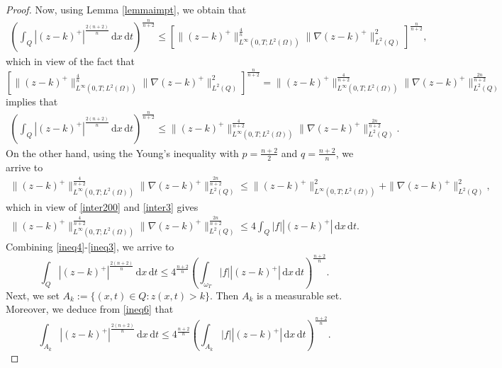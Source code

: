 \documentclass[reqno,twoside]{amsart}
\numberwithin{equation}{section}
\theoremstyle{definition}
\numberwithin{equation}{section}
\def \dis {\displaystyle}
\def \dq {\mathrm{d}x \, \mathrm{d}t}
\begin{document}
\begin{proof}
	Now, using Lemma \ref{lemmaimpt}, we obtain that
	$$
	\begin{array}{lll}
		\dis\left(\int_{Q} |(z-k)^+|^{\frac{2(n+2)}{n}}\,\dq\right)^{\frac{n}{n+2}}
		\leq \left[ \|(z-k)^+\|^{\frac{4}{n}}_{L^\infty(0,T;L^2(\Omega))}\|\nabla(z-k)^+\|^{2}_{L^2(Q)}\right]^{\frac{n}{n+2}},
	\end{array}
	$$
	which in view of the fact that
	$$\dis\left[ \|(z-k)^+\|^{\frac{4}{n}}_{L^\infty(0,T;L^2(\Omega))}\|\nabla(z-k)^+\|^{2}_{L^2(Q)}\right]^{\frac{n}{n+2}}=
	\|(z-k)^+\|^{\frac{4}{n+2}}_{L^\infty(0,T;L^2(\Omega))}\|\nabla(z-k)^+\|^{\frac{2n}{n+2}}_{L^2(Q)}
	$$
	implies that
	\begin{equation}\label{ineq4}
		\begin{array}{lll}
			\dis\left(\int_{Q} |(z-k)^+|^{\frac{2(n+2)}{n}}\,\dq\right)^{\frac{n}{n+2}}
			\leq \|(z-k)^+\|^{\frac{4}{n+2}}_{L^\infty(0,T;L^2(\Omega))}\|\nabla(z-k)^+\|^{\frac{2n}{n+2}}_{L^2(Q)}.
		\end{array}
	\end{equation}
	On the other hand, using the Young's inequality with $p=\frac{n+2}{2}$ and $q=\frac{n+2}{n}$, we arrive to
	$$
	\begin{array}{lll}
		\dis \|(z-k)^+\|^{\frac{4}{n+2}}_{L^\infty(0,T;L^2(\Omega))}\|\nabla(z-k)^+\|^{\frac{2n}{n+2}}_{L^2(Q)}\leq\|(z-k)^+\|^2_{L^\infty(0,T;L^2(\Omega))}+\|\nabla(z-k)^+\|^2_{L^2(Q)},
	\end{array}
	$$
	which in view of \eqref{inter200} and \eqref{inter3} gives
	\begin{equation}\label{ineq3}
		\begin{array}{lll}
			\dis \|(z-k)^+\|^{\frac{4}{n+2}}_{L^\infty(0,T;L^2(\Omega))}\|\nabla(z-k)^+\|^{\frac{2n}{n+2}}_{L^2(Q)}
			\leq 4 \dis \int_{Q}|f||(z-k)^+|\,\dq.
		\end{array}
	\end{equation}
	Combining \eqref{ineq4}-\eqref{ineq3}, we arrive to
	\begin{equation}\label{ineq6}
		\int_{Q} |(z-k)^+|^{\frac{2(n+2)}{n}}\,\dq\leq 4^{\frac{n+2}{n}} \left(\int_{\omega_T}|f||(z-k)^+|\,\dq\right)^{\frac{n+2}{n}}.
	\end{equation}
	Next, we set $A_k:=\{(x,t)\in Q:z(x,t)>k\}$. Then $A_k$ is a measurable set. Moreover, we deduce from \eqref{ineq6} that
	\begin{equation}\label{ineq7}
		\int_{A_k} |(z-k)^+|^{\frac{2(n+2)}{n}}\,\dq\leq  4^{\frac{n+2}{n}} \left(\int_{A_k}|f||(z-k)^+|\,\dq\right)^{\frac{n+2}{n}}.
	\end{equation}

\end{proof}
\end{document}
